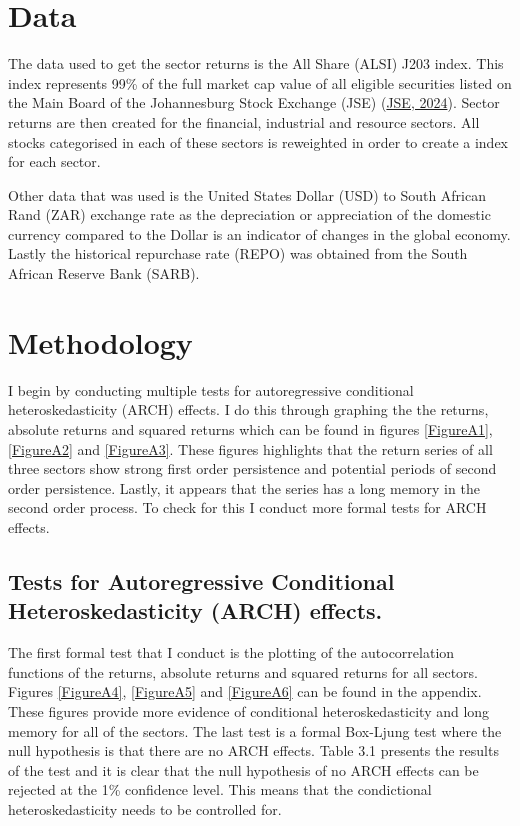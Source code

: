 \documentclass[11pt,preprint, authoryear]{elsarticle}
\numberwithin{equation}{section}
\numberwithin{figure}{section}
\numberwithin{table}{section}
\begin{document}
\hypertarget{data}{%
\section{Data}\label{data}}

The data used to get the sector returns is the All Share (ALSI) J203
index. This index represents 99\% of the full market cap value of all
eligible securities listed on the Main Board of the Johannesburg Stock
Exchange (JSE) (\protect\hyperlink{ref-jse_website}{JSE, 2024}). Sector
returns are then created for the financial, industrial and resource
sectors. All stocks categorised in each of these sectors is reweighted
in order to create a index for each sector.

Other data that was used is the United States Dollar (USD) to South
African Rand (ZAR) exchange rate as the depreciation or appreciation of
the domestic currency compared to the Dollar is an indicator of changes
in the global economy. Lastly the historical repurchase rate (REPO) was
obtained from the South African Reserve Bank (SARB).

\hypertarget{methodology}{%
\section{Methodology}\label{methodology}}

I begin by conducting multiple tests for autoregressive conditional
heteroskedasticity (ARCH) effects. I do this through graphing the the
returns, absolute returns and squared returns which can be found in
figures \ref{FigureA1}, \ref{FigureA2} and \ref{FigureA3}. These figures
highlights that the return series of all three sectors show strong first
order persistence and potential periods of second order persistence.
Lastly, it appears that the series has a long memory in the second order
process. To check for this I conduct more formal tests for ARCH effects.

\hypertarget{tests-for-autoregressive-conditional-heteroskedasticity-arch-effects.}{%
\subsection{Tests for Autoregressive Conditional Heteroskedasticity
(ARCH)
effects.}\label{tests-for-autoregressive-conditional-heteroskedasticity-arch-effects.}}

The first formal test that I conduct is the plotting of the
autocorrelation functions of the returns, absolute returns and squared
returns for all sectors. Figures \ref{FigureA4}, \ref{FigureA5} and
\ref{FigureA6} can be found in the appendix. These figures provide more
evidence of conditional heteroskedasticity and long memory for all of
the sectors. The last test is a formal Box-Ljung test where the null
hypothesis is that there are no ARCH effects. Table 3.1 presents the
results of the test and it is clear that the null hypothesis of no ARCH
effects can be rejected at the 1\% confidence level. This means that the
condictional heteroskedasticity needs to be controlled for.
\end{document}
